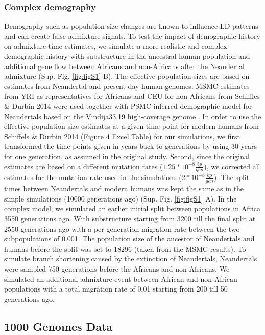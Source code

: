 \documentclass[]{article}
\begin{document}
\subsubsection{Complex demography}\label{inferred demography}

Demography such as population size changes are known to influence LD
patterns and can create false admixture signals. To test the impact of
demographic history on admixture time estimates, we simulate a more
realistic and complex demographic history with substructure in the ancestral human population and additional gene flow between Africans and non-Africans after the Neandertal admixture (Sup. Fig. \ref{fig:figS1} B). The 
effective population
sizes are based on estimates from Neandertal and present-day human
genomes. MSMC estimates from YRI as representatives for Africans and CEU
for non-Africans from Schiffles \& Durbin 2014
\citep{schiffels_inferring_2014} were used together with PSMC
\citep{li_inference_2011} inferred demographic model for Neandertals
based on the Vindija33.19 high-coverage genome
\citep{mafessoni_high_coverage_2020}. In order to use the effective
population size estimates at a given time point for modern humans from
Schiffels \& Durbin 2014 (Figure 4 Excel Table) for our simulations, we
first transformed the time points given in years back to generations by
using 30 years for one generation, as assumed in the original study.
Second, since the original estimates are based on a different mutation
rates (\(1.25*10^{-8} \frac{bp}{gen}\)), we corrected all estimates for
the mutation rate used in the simulations
(\(2*10^{-8} \frac{bp}{gen}\)). The split times between Neandertals and
modern humans was kept the
same as in the simple simulations (10000 generations ago) (Sup. Fig. \ref{fig:figS1} A). In the complex model, we simulated an earlier initial split between populations in Africa 3550 generations ago. With substructure starting from 3200 till the final split at 2550 generations ago with a per generation migration rate between the two subpopulations of 0.001. The population size of the ancestor of Neandertals and
humans before the split was set to 18296 (taken from the MSMC results). To simulate branch shortening
caused by the extinction of Neandertals, Neandertals were sampled 750
generations before the Africans and non-Africans. We simulated an additional admixture event between African and non-African populations with a total migration rate of 0.01 starting from 200 till 50 generations ago.

\subsection{1000 Genomes Data}\label{1000 Genomes Data}
\end{document}

